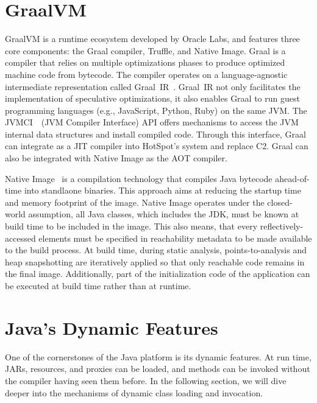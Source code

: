 \section{GraalVM}
GraalVM is a runtime ecosystem developed by Oracle Labs, and features three core components: the Graal compiler, Truffle, and Native Image. 
Graal is a compiler that relies on multiple optimizations phases to produce optimized machine code from bytecode. The compiler operates on a language-agnostic intermediate representation called Graal~IR~\cite{duboscq_graal_nodate}. Graal~IR not only facilitates the implementation of speculative optimizations, it also enables Graal to run guest programming languages (e.g., JavaScript, Python, Ruby) on the same JVM. 
The JVMCI~\cite{noauthor_jep_nodate}~(JVM Compiler Interface) API offers mechanisms to access the JVM internal data structures and install compiled code. Through this interface, Graal can integrate as a JIT compiler into HotSpot's system and replace C2. 
Graal can also be integrated with Native Image as the AOT compiler.

Native Image~\cite{wimmer_initialize_2019} is a compilation technology that compiles Java bytecode ahead-of-time into standlaone binaries. This approach aims at reducing the startup time and memory footprint of the image. Native Image operates under the closed-world assumption, all Java classes, which includes the JDK, must be known at build time to be included in the image.
This also means, that every reflectively-accessed elements must be specified in reachability metadata to be made available to the build process. 
At build time, during static analysis, points-to-analysis and heap snapshotting are iteratively applied so that only reachable code remains in the final image. Additionally, part of the initialization code of the application can be executed at build time rather than at runtime.

\section{Java's Dynamic Features}
One of the cornerstones of the Java platform is its dynamic features. At run time, JARs, resources, and proxies can be loaded, and methods can be invoked without the compiler having seen them before. In the following section, we will dive deeper into the mechanisms of dynamic class loading and invocation.

